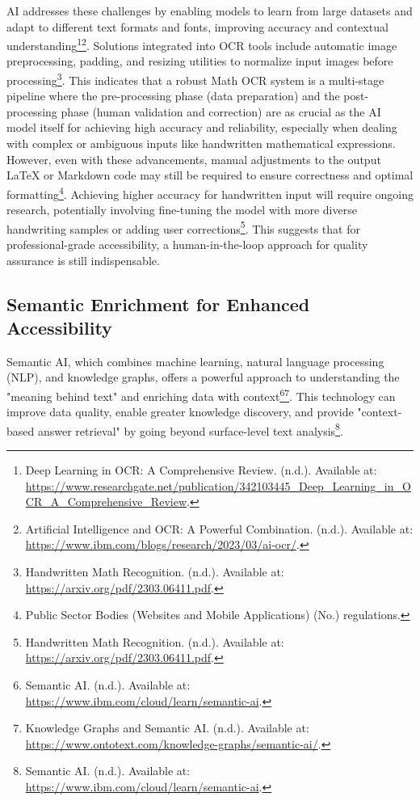 AI addresses these challenges by enabling models to learn from large datasets and adapt to different text formats and fonts, improving accuracy and contextual understanding\footnote{Deep Learning in OCR: A Comprehensive Review. (n.d.). Available at: \url{https://www.researchgate.net/publication/342103445_Deep_Learning_in_OCR_A_Comprehensive_Review}.}\footnote{Artificial Intelligence and OCR: A Powerful Combination. (n.d.). Available at: \url{https://www.ibm.com/blogs/research/2023/03/ai-ocr/}.}. Solutions integrated into OCR tools include automatic image preprocessing, padding, and resizing utilities to normalize input images before processing\footnote{Handwritten Math Recognition. (n.d.). Available at: \url{https://arxiv.org/pdf/2303.06411.pdf}.}. This indicates that a robust Math OCR system is a multi-stage pipeline where the pre-processing phase (data preparation) and the post-processing phase (human validation and correction) are as crucial as the AI model itself for achieving high accuracy and reliability, especially when dealing with complex or ambiguous inputs like handwritten mathematical expressions. However, even with these advancements, manual adjustments to the output LaTeX or Markdown code may still be required to ensure correctness and optimal formatting\footnote{Public Sector Bodies (Websites and Mobile Applications) (No.) regulations.}. Achieving higher accuracy for handwritten input will require ongoing research, potentially involving fine-tuning the model with more diverse handwriting samples or adding user corrections\footnote{Handwritten Math Recognition. (n.d.). Available at: \url{https://arxiv.org/pdf/2303.06411.pdf}.}. This suggests that for professional-grade accessibility, a human-in-the-loop approach for quality assurance is still indispensable.

\subsection{Semantic Enrichment for Enhanced Accessibility}
Semantic AI, which combines machine learning, natural language processing (NLP), and knowledge graphs, offers a powerful approach to understanding the "meaning behind text" and enriching data with context\footnote{Semantic AI. (n.d.). Available at: \url{https://www.ibm.com/cloud/learn/semantic-ai}.}\footnote{Knowledge Graphs and Semantic AI. (n.d.). Available at: \url{https://www.ontotext.com/knowledge-graphs/semantic-ai/}.}. This technology can improve data quality, enable greater knowledge discovery, and provide "context-based answer retrieval" by going beyond surface-level text analysis\footnote{Semantic AI. (n.d.). Available at: \url{https://www.ibm.com/cloud/learn/semantic-ai}.}.

